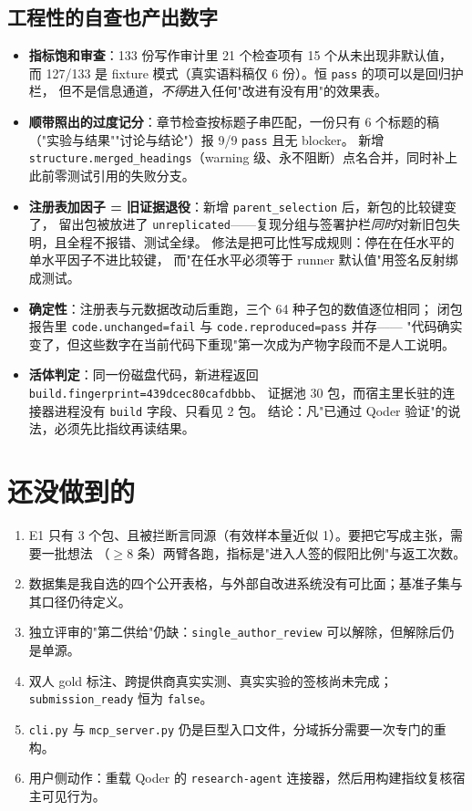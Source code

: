 \documentclass[11pt,a4paper]{ctexart}
\begin{document}
\subsection{工程性的自查也产出数字}

\begin{itemize}[leftmargin=1.6em]
  \item \textbf{指标饱和审查}：133 份写作审计里 21 个检查项有 15 个从未出现非默认值，
        而 127/133 是 fixture 模式（真实语料稿仅 6 份）。恒 \texttt{pass} 的项可以是回归护栏，
        但不是信息通道，\emph{不得}进入任何"改进有没有用"的效果表。
  \item \textbf{顺带照出的过度记分}：章节检查按标题子串匹配，一份只有 6 个标题的稿
        （"实验与结果""讨论与结论"）报 9/9 \texttt{pass} 且无 blocker。
        新增 \texttt{structure.merged\_headings}（warning 级、永不阻断）点名合并，同时补上此前零测试引用的失败分支。
  \item \textbf{注册表加因子 = 旧证据退役}：新增 \texttt{parent\_selection} 后，新包的比较键变了，
        留出包被放进了 \texttt{unreplicated}——复现分组与签署护栏\emph{同时}对新旧包失明，且全程不报错、测试全绿。
        修法是把可比性写成规则：停在在任水平的单水平因子不进比较键，
        而"在任水平必须等于 runner 默认值"用签名反射绑成测试。
  \item \textbf{确定性}：注册表与元数据改动后重跑，三个 64 种子包的数值逐位相同；
        闭包报告里 \texttt{code.unchanged=fail} 与 \texttt{code.reproduced=pass} 并存——
        "代码确实变了，但这些数字在当前代码下重现"第一次成为产物字段而不是人工说明。
  \item \textbf{活体判定}：同一份磁盘代码，新进程返回 \texttt{build.fingerprint=439dcec80cafdbbb}、
        证据池 30 包，而宿主里长驻的连接器进程没有 \texttt{build} 字段、只看见 2 包。
        结论：凡"已通过 Qoder 验证"的说法，必须先比指纹再读结果。
\end{itemize}

\section{还没做到的}

\begin{enumerate}[leftmargin=1.9em]
  \item E1 只有 3 个包、且被拦断言同源（有效样本量近似 1）。要把它写成主张，需要一批想法
        （$\ge 8$ 条）两臂各跑，指标是"进入人签的假阳比例"与返工次数。
  \item 数据集是我自选的四个公开表格，与外部自改进系统没有可比面；基准子集与其口径仍待定义。
  \item 独立评审的"第二供给"仍缺：\texttt{single\_author\_review} 可以解除，但解除后仍是单源。
  \item 双人 gold 标注、跨提供商真实实测、真实实验的签核尚未完成；\texttt{submission\_ready} 恒为 \texttt{false}。
  \item \texttt{cli.py} 与 \texttt{mcp\_server.py} 仍是巨型入口文件，分域拆分需要一次专门的重构。
  \item 用户侧动作：重载 Qoder 的 \texttt{research-agent} 连接器，然后用构建指纹复核宿主可见行为。
\end{enumerate}
\end{document}
